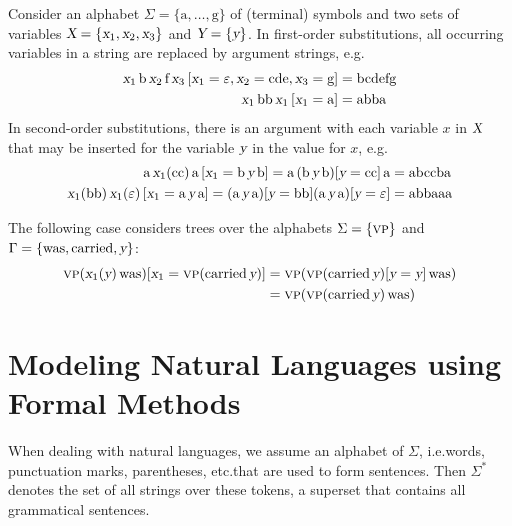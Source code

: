 \documentclass[../document.tex]{subfiles}
\begin{document}
    \begin{example}[Substitution]
        Consider an alphabet \(\Sigma = \{\text{a}, \ldots, \text{g}\}\) of (terminal) symbols and two sets of variables \(\textsl{X} = \{\textsl{x}_1, \textsl{x}_2, \textsl{x}_3\}\) and \(\textsl{Y} = \{\textsl{y}\}\).
        In first-order substitutions, all occurring variables in a string are replaced by argument strings, e.g.
        \begin{align*}
            \textsl{x}_1 \, \text{b} \, \textsl{x}_2 \, \text{f} \, \textsl{x}_3\,[\textsl{x}_1=\varepsilon, \textsl{x}_2=\text{cde}, \textsl{x}_3=\text{g}] &= \text{bcdefg} \\
            \textsl{x}_1 \, \text{bb} \, \textsl{x}_1 \, [\textsl{x}_1=\text{a}] &= \text{abba}
        \end{align*}
        In second-order substitutions, there is an argument with each variable \(x\) in \(\textsl{X}\) that may be inserted for the variable \(\textsl{y}\) in the value for \(x\), e.g.
        \begin{align*}
            \text{a} \, \textsl{x}_1(\text{cc}) \, \text{a} \, [\textsl{x}_1=\text{b}\,\textsl{y}\,\text{b}] = \text{a} \, (\text{b}\,\textsl{y}\,\text{b})[\textsl{y}=\text{cc}] \, \text{a} &= \text{abccba} \\
            \textsl{x}_1(\text{bb}) \, \textsl{x}_1(\varepsilon) \, [\textsl{x}_1=\text{a}\,\textsl{y}\,\text{a}] = (\text{a}\,\textsl{y}\,\text{a})[\textsl{y}=\text{bb}] (\text{a}\,\textsl{y}\,\text{a})[\textsl{y}=\varepsilon] &= \text{abbaaa}
        \end{align*}

        The following case considers trees over the alphabets \(\Sigma=\{\textsc{vp}\}\) and \(\Gamma=\{\text{was}, \text{carried}, \textsl{y}\}\):
        \begin{align*}
            \textsc{vp}( \textsl{x}_1(\textsl{y}) \, \text{was} )[\textsl{x}_1=\textsc{vp}(\text{carried}\,\textsl{y})]
                &= \textsc{vp}( \textsc{vp}(\text{carried}\,\textsl{y})[\textsl{y}=\textsl{y}] \, \text{was} ) \\
                &= \textsc{vp}(\textsc{vp}(\text{carried}\,\textsl{y})\,\text{was})
        \end{align*}
    \end{example}

    \section{Modeling Natural Languages using Formal Methods}\label{sec:preliminaries:ctrees}
    When dealing with natural languages, we assume an \gls*{alphabet} of  \(\Sigma\), i.e.\@ words, punctuation marks, parentheses, etc.\@ that are used to form sentences.
    Then \(\Sigma^*\) denotes the set of all strings over these tokens, a superset that contains all grammatical sentences.
\end{document}
